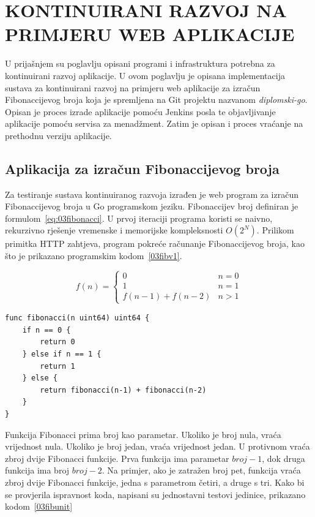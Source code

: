 \chapter{KONTINUIRANI RAZVOJ NA PRIMJERU WEB APLIKACIJE}
U prijašnjem su poglavlju opisani programi i infrastruktura potrebna za kontinuirani razvoj
aplikacije. U ovom poglavlju je opisana implementacija sustava za kontinuirani razvoj na primjeru
web aplikacije za izračun Fibonaccijevog broja koja je spremljena na Git projektu nazvanom
\textit{diplomski-go}. Opisan je proces izrade aplikacije pomoću Jenkins posla te objavljivanje
aplikacije pomoću servisa za menadžment. Zatim je opisan i proces vraćanje na prethodnu verziju
aplikacije.

\section{Aplikacija za izračun Fibonaccijevog broja}
Za testiranje sustava kontinuiranog razvoja izrađen je web program za izračun Fibonaccijevog broja u
Go programskom jeziku. Fibonaccijev broj definiran je formulom~\ref{eq:03fibonacci}.  U prvoj
iteraciji programa koristi se naivno, rekurzivno rješenje vremenske i memorijske kompleksnosti
$O(2^N)$. Prilikom primitka HTTP zahtjeva, program pokreće računanje Fibonaccijevog broja, kao što
je prikazano programskim kodom~\ref{03fibv1}.

\begin{equation}
    f(n) = \begin{cases}
               0                & n = 0\\
               1                & n = 1\\
               f(n-1) + f(n-2)  & n > 1
           \end{cases}
   \label{eq:03fibonacci}
\end{equation}

\begin{lstlisting}[float=h]
func fibonacci(n uint64) uint64 {
	if n == 0 {
		return 0
	} else if n == 1 {
		return 1
	} else {
		return fibonacci(n-1) + fibonacci(n-2)
	}
}
\end{lstlisting}

Funkcija Fibonacci prima broj kao parametar. Ukoliko je broj nula, vraća vrijednost nula.
Ukoliko je broj jedan, vraća vrijednost jedan. U protivnom vraća zbroj dvije Fibonacci funkcije.
Prva funkcija ima parametar $broj-1$, dok druga funkcija ima broj $broj-2$. Na primjer, ako je
zatražen broj pet, funkcija vraća zbroj dvije Fibonacci funkcije, jedna s parametrom četiri, a druge
s tri. Kako bi se provjerila ispravnost koda, napisani su jednostavni testovi jedinice, prikazano
kodom~\ref{03fibunit}

